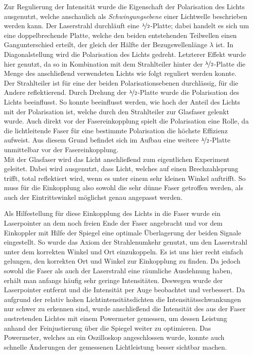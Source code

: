  Zur Regulierung der Intensität wurde die Eigenschaft der Polarisation des Lichts ausgenutzt, welche anschaulich als \textit{Schwingungsebene} einer Lichtwelle beschrieben werden kann. Der Laserstrahl durchläuft eine $\nicefrac{\lambda}{2}$-Platte; dabei handelt es sich um eine doppelbrechende Platte, welche den beiden entstehenden Teilwellen einen Gangunterschied erteilt, der gleich der Hälfte der Bezugswellenlänge $\lambda$ ist. In Diagonalstellung wird die Polarisation des Lichts gedreht. Letzterer Effekt wurde hier genutzt, da so in Kombination mit dem Strahlteiler hinter der $\nicefrac{\lambda}{2}$-Platte die Menge des anschließend verwendeten Lichts wie folgt reguliert werden konnte. Der Strahlteiler ist für eine der beiden Polarisationsebenen durchlässig, für die Andere reflektierend. Durch Drehung der $\nicefrac{\lambda}{2}$-Platte wurde die Polarisation des Lichts beeinflusst. So konnte beeinflusst werden, wie hoch der Anteil des Lichts mit der Polarisation ist, welche durch den Strahlteiler zur Glasfaser gelenkt wurde. Auch direkt vor der Fasereinkopplung spielt die Polarisation eine Rolle, da die lichtleitende Faser für eine bestimmte Polarisation die höchste Effizienz aufweist. Aus diesem Grund befindet sich im Aufbau eine weitere $\nicefrac{\lambda}{2}$-Platte unmittelbar vor der Fasereinkopplung.\\

Mit der Glasfaser wird das Licht anschließend zum eigentlichen Experiment geleitet. Dabei wird ausgenutzt, dass Licht, welches auf einen Brechzahlsprung trifft, total reflektiert wird, wenn es unter einem sehr kleinen Winkel auftrifft. So muss für die Einkopplung also sowohl die sehr dünne Faser getroffen werden, als auch der Eintrittswinkel möglichst genau angepasst werden.

Als Hilfestellung für diese Einkopplung des Lichts in die Faser wurde ein Laserpointer an dem noch freien Ende der Faser angebracht und vor dem Einkoppler mit Hilfe der Spiegel eine optimale Überlagerung der beiden Signale eingestellt. So wurde das Axiom der Strahlenumkehr genutzt, um den Laserstrahl unter dem korrekten Winkel und Ort einzukoppeln. Es ist uns hier recht einfach gelungen, den korrekten Ort und Winkel zur Einkopplung zu finden. Da jedoch sowohl die Faser als auch der Laserstrahl eine räumliche Ausdehnung haben, erhält man anfangs häufig sehr geringe Intensitäten. Deswegen wurde der Laserpointer entfernt und die Intensität per Auge beobachtet und verbessert. Da aufgrund der relativ hohen Lichtintensitätsdichten die Intensitätsschwankungen  nur schwer zu erkennen sind, wurde anschließend die Intensität des aus der Faser austretenden Lichtes mit einem Powermeter gemessen, um dessen Leistung anhand der Feinjustierung über die Spiegel weiter zu optimieren. Das Powermeter, welches an ein Oszilloskop angeschlossen wurde, konnte auch schnelle Änderungen der gemessenen Lichtleistung besser sichtbar machen.

